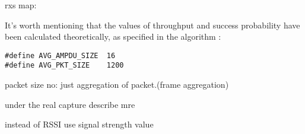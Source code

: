 
rxs map: 




It's worth mentioning that the values of throughput and success probability have been calculated theoretically, as specified in the algorithm :

\begin{lstlisting}
#define AVG_AMPDU_SIZE	16
#define AVG_PKT_SIZE	1200
\end{lstlisting}

packet size no: just aggregation of packet.(frame aggregation)



under the real capture describe mre

instead of RSSI use signal strength value





